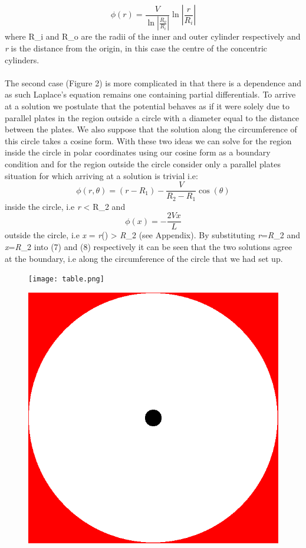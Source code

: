 \documentclass{article}
\begin{document}
\begin{equation}
\phi(r)=\frac{V}{\ln\left|\frac{R_o}{R_i}\right|}\ln\left|\frac{r}{R_i}\right|
\label{29}
\end{equation}
where R_i\) and R_o\) are the radii of the inner and outer cylinder respectively and \textit{r} is the distance from the origin, in this case the centre of the concentric cylinders. \\
\\
The second case (Figure 2) is more complicated in that there is a \theta\) dependence and as such Laplace's equation remains one containing partial differentials. To arrive at a solution we postulate that the potential behaves as if it were solely due to parallel plates in the region outside a circle with a diameter equal to the distance between the plates. We also suppose that the solution along the circumference of this circle takes a cosine form. With these two ideas we can solve for the region inside the circle in polar coordinates using our cosine form as a boundary condition and for the region outside the circle consider only a parallel plates situation for which arriving at a solution is trivial i.e: 
\begin{equation}
\phi(r,\theta)=(r-R_1)-\frac{V}{R_2-R_1}\cos(\theta)
\label{}
\end{equation}
inside the circle, i.e \textit{r} < R_2\) and
\begin{equation}
\phi(x)=-\frac{2Vx}{L}
\label{}
\end{equation}
outside the circle, i.e \textit{x} = \textit{r}\cos(\theta)\) > \textit{R}_2\) (see Appendix). By substituting \textit{r}=\textit{R}_2\) and \textit{x}=\textit{R}_2\cos\theta\) into (7) and (8) respectively it can be seen that the two solutions agree at the boundary, i.e along the circumference of the circle that we had set up. 

\begin{figure}
\centering
\begin{minipage}{.5\textwidth}
  \centering
  \texttt{[image: table.png]}
  \label{fig:test1}
\end{minipage}%
\begin{minipage}{.5\textwidth}
  \centering
  \includegraphics[width=.6\linewidth]{../prob0HR.png}
  \label{fig:test2}
\end{minipage}
\end{figure}
\end{document}
